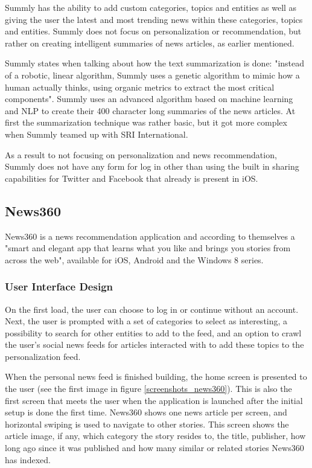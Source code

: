 Summly has the ability to add custom categories, topics and entities as well as giving the user the latest and most trending news within these categories, topics and entities. Summly does not focus on personalization or recommendation, but rather on creating intelligent summaries of news articles, as earlier mentioned. 

Summly states when talking about how the text summarization is done: "instead of a robotic, linear algorithm, Summly uses a genetic algorithm to mimic how a human actually thinks, using organic metrics to extract the most critical components"\cite{summly_launch_video}. Summly uses an advanced algorithm based on machine learning and NLP to create their 400 character long summaries of the news articles. At first the summarization technique was rather basic, but it got more complex when Summly teamed up with SRI International\cite{summly_technology}.

As a result to not focusing on personalization and news recommendation, Summly does not have any form for log in other than using the built in sharing capabilities for Twitter and Facebook that already is present in iOS.

\subsection{News360}

News360 is a news recommendation application and according to themselves a "smart and elegant app that learns what you like and brings you stories from across the web"\cite{news360_about}, available for iOS, Android and the Windows 8 series.

\subsubsection{User Interface Design}
On the first load, the user can choose to log in or continue without an account. Next, the user is prompted with a set of categories to select as interesting, a possibility to search for other entities to add to the feed, and an option to crawl the user's social news feeds for articles interacted with to add these topics to the personalization feed.

When the personal news feed is finished building, the home screen is presented to the user (see the first image in figure \ref{screenshots_news360}). This is also the first screen that meets the user when the application is launched after the initial setup is done the first time. News360 shows one news article per screen, and horizontal swiping is used to navigate to other stories. This screen shows the article image, if any, which category the story resides to, the title, publisher, how long ago since it was published and how many similar or related stories News360 has indexed.

